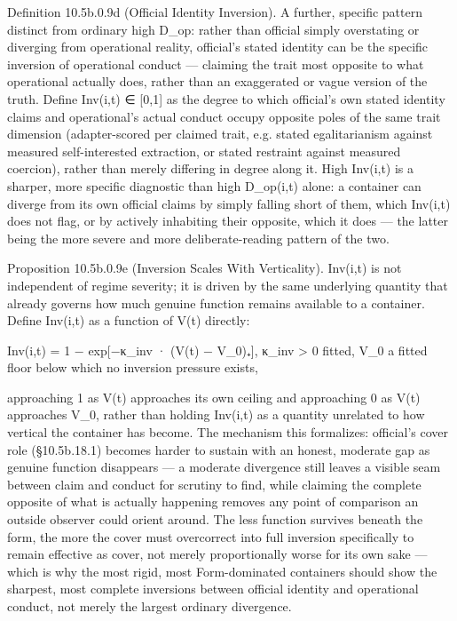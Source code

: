 \documentclass[
]{article}
\begin{document}
Definition 10.5b.0.9d (Official Identity Inversion). A further, specific
pattern distinct from ordinary high D\_op: rather than official simply
overstating or diverging from operational reality, official's stated
identity can be the specific inversion of operational conduct ---
claiming the trait most opposite to what operational actually does,
rather than an exaggerated or vague version of the truth. Define
Inv(i,t) ∈ {[}0,1{]} as the degree to which official's own stated
identity claims and operational's actual conduct occupy opposite poles
of the same trait dimension (adapter-scored per claimed trait, e.g.
stated egalitarianism against measured self-interested extraction, or
stated restraint against measured coercion), rather than merely
differing in degree along it. High Inv(i,t) is a sharper, more specific
diagnostic than high D\_op(i,t) alone: a container can diverge from its
own official claims by simply falling short of them, which Inv(i,t) does
not flag, or by actively inhabiting their opposite, which it does ---
the latter being the more severe and more deliberate-reading pattern of
the two.

Proposition 10.5b.0.9e (Inversion Scales With Verticality). Inv(i,t) is
not independent of regime severity; it is driven by the same underlying
quantity that already governs how much genuine function remains
available to a container. Define Inv(i,t) as a function of V(t)
directly:

Inv(i,t) = 1 − exp{[}−κ\_inv · (V(t) − V\_0)₊{]}, κ\_inv \textgreater{}
0 fitted, V\_0 a fitted floor below which no inversion pressure exists,

approaching 1 as V(t) approaches its own ceiling and approaching 0 as
V(t) approaches V\_0, rather than holding Inv(i,t) as a quantity
unrelated to how vertical the container has become. The mechanism this
formalizes: official's cover role (§10.5b.18.1) becomes harder to
sustain with an honest, moderate gap as genuine function disappears ---
a moderate divergence still leaves a visible seam between claim and
conduct for scrutiny to find, while claiming the complete opposite of
what is actually happening removes any point of comparison an outside
observer could orient around. The less function survives beneath the
form, the more the cover must overcorrect into full inversion
specifically to remain effective as cover, not merely proportionally
worse for its own sake --- which is why the most rigid, most
Form-dominated containers should show the sharpest, most complete
inversions between official identity and operational conduct, not merely
the largest ordinary divergence.
\end{document}
